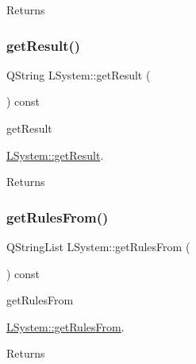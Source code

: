 \begin{DoxyReturn}{Returns}

\end{DoxyReturn}
\mbox{\label{classLSystem_a10af0c8572f41e0eb1f2306c09c894d0}} 
\subsubsection{\texorpdfstring{get\+Result()}{getResult()}}
{\footnotesize\ttfamily Q\+String L\+System\+::get\+Result (\begin{DoxyParamCaption}{ }\end{DoxyParamCaption}) const}



get\+Result 

\hyperlink{classLSystem_a10af0c8572f41e0eb1f2306c09c894d0}{L\+System\+::get\+Result}.

\begin{DoxyReturn}{Returns}

\end{DoxyReturn}
\mbox{\label{classLSystem_a05707c5386d45068ec6ef243f45abe72}} 
\subsubsection{\texorpdfstring{get\+Rules\+From()}{getRulesFrom()}}
{\footnotesize\ttfamily Q\+String\+List L\+System\+::get\+Rules\+From (\begin{DoxyParamCaption}{ }\end{DoxyParamCaption}) const}



get\+Rules\+From 

\hyperlink{classLSystem_a05707c5386d45068ec6ef243f45abe72}{L\+System\+::get\+Rules\+From}.

\begin{DoxyReturn}{Returns}

\end{DoxyReturn}
\mbox{\label{classLSystem_aae9f8d83e3f0b2ad3805ce7cfe423754}} 
